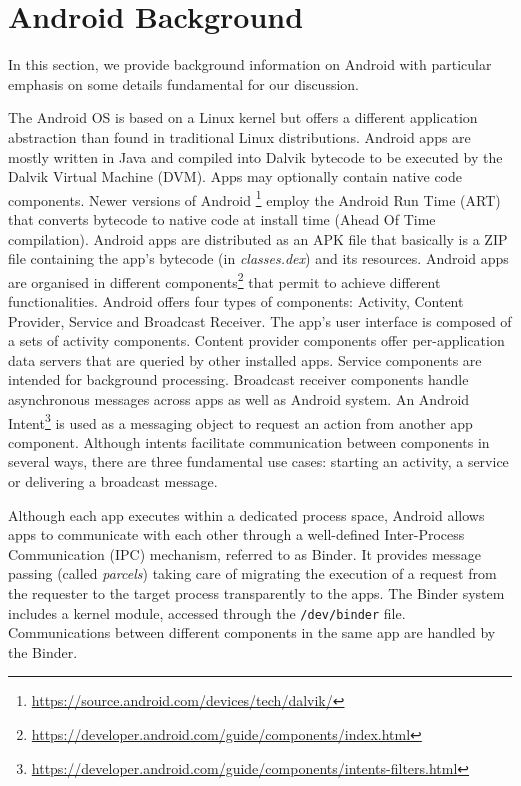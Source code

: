 \section{Android Background}
In this section, we provide background information on Android with particular emphasis on some details fundamental for our discussion. 

The Android OS is based on a Linux kernel but offers a different application abstraction than found in traditional Linux distributions. Android apps are mostly written in Java and compiled into Dalvik bytecode to be executed by the Dalvik Virtual Machine (DVM). Apps may optionally contain native code components. Newer versions of Android \footnote{\url{https://source.android.com/devices/tech/dalvik/}} employ the Android Run Time (ART) that converts bytecode to native code at install time (Ahead Of Time compilation). Android apps are distributed as an APK file that basically is a ZIP file containing the app's bytecode (in \textit{classes.dex}) and its resources. Android apps are organised in different components\footnote{\url{https://developer.android.com/guide/components/index.html}} that permit to achieve different functionalities. Android offers four types of components: Activity,  Content Provider, Service and Broadcast Receiver. The app's user interface is composed of a sets of activity components. Content provider components offer per-application data servers that are queried by other installed apps. Service components are intended for background processing. Broadcast receiver components handle asynchronous messages across apps as well as Android system. An Android Intent\footnote{\url{https://developer.android.com/guide/components/intents-filters.html}} is used as a messaging object to request an action from another app component. Although intents facilitate communication between components in several ways, there are three fundamental use cases: starting an activity, a service or delivering a broadcast message.

Although each app executes within a dedicated process space, Android allows apps to communicate with each other through a well-defined Inter-Process Communication (IPC) mechanism, referred to as Binder. It provides message passing (called \textit{parcels}) taking care of migrating the execution of a request from the requester to the target process transparently to the apps. The Binder system includes a kernel module, accessed through the \texttt{/dev/binder} file. Communications between different components in the same app are handled by the Binder.  

